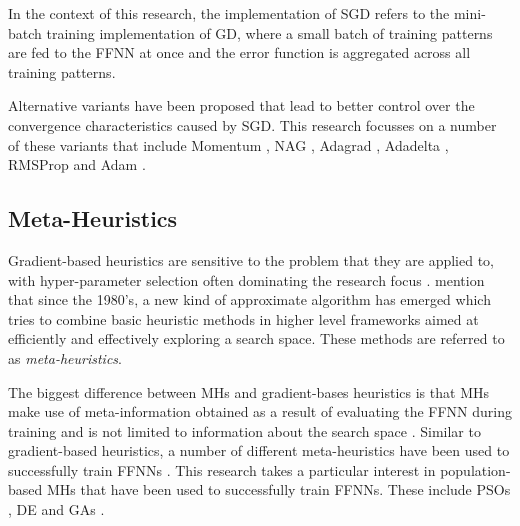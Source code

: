 In the context of this research, the implementation of \acs{SGD} refers to the mini-batch training implementation of \acs{GD}, where a small batch of training patterns are fed to the \acs{FFNN} at once and the error function is aggregated across all training patterns.

Alternative variants have been proposed that lead to better control over the convergence characteristics caused by \acs{SGD}. This research focusses on a number of these variants that include \Acs{Momentum} \cite{ref:qian:1999}, \Acf{NAG} \cite{ref:sutskever:2013}, \Acf{Adagrad} \cite{ref:duchi:2011}, \acs{Adadelta} \cite{ref:zeiler:2012}, \Acf{RMSProp} \cite{ref:hinton:2012} and \Acf{Adam} \cite{ref:kingma:2014}.

\subsection{Meta-Heuristics}\label{sec:heuristics:mh}

Gradient-based heuristics are sensitive to the problem that they are applied to, with hyper-parameter selection often dominating the research focus \cite{ref:bengio:2000, ref:feurer:2019}. \citeauthor{ref:blum:2003} \cite{ref:blum:2003} mention that since the 1980's, a new kind of approximate algorithm has emerged which tries to combine basic heuristic methods in higher level frameworks aimed at efficiently and effectively exploring a search space. These methods are referred to as \textit{meta-heuristics}.

The biggest difference between \acp{MH} and gradient-bases heuristics is that
\acp{MH} make use of meta-information obtained as a result of evaluating the \acs{FFNN} during training and is not limited to information about the search space \cite{ref:blum:2003}. Similar to gradient-based heuristics, a number of different meta-heuristics have been used to successfully train \acp{FFNN} \cite{ref:rakitianskaia:2012, ref:vanwyk:2014, ref:espinal:2011, ref:gupta:1999}. This research takes a particular interest in population-based \acp{MH} that have been used to successfully train \acp{FFNN}. These include \acp{PSO} \cite{ref:shi:1998}, \acf{DE} \cite{ref:price:2006} and \Acp{GA} \cite{ref:fraser:1957}.